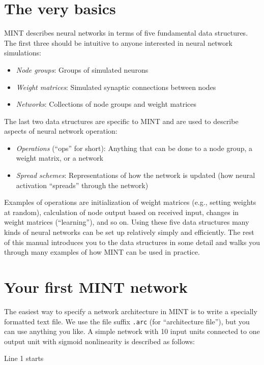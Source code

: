 \documentclass[12pt,letterpaper]{memoir}
\newcommand{\mint}{MINT\xspace}
\begin{document}
\section{The very basics}
\label{sec:the-very-basics}

\mint describes neural networks in terms of five fundamental data
structures. The first three should be intuitive to anyone interested
in neural network simulations:
\begin{itemize}
\item \textit{Node groups}: Groups of simulated neurons
\item \textit{Weight matrices}: Simulated synaptic connections between
  nodes
\item \textit{Networks}: Collections of node groups and weight
  matrices
\end{itemize}
The last two data structures are specific to \mint and are used to
describe aspects of neural network operation:
\begin{itemize}
\item \textit{Operations} (``ops'' for short): Anything that can be
  done to a node group, a weight matrix, or a network
\item\textit{Spread schemes}: Representations of how the network
  is updated (how neural activation ``spreads'' through the network)
\end{itemize}
Examples of operations are initialization of weight matrices (e.g.,
setting weights at random), calculation of node output based on
received input, changes in weight matrices (``learning''), and so
on. Using these five data structures many kinds of neural networks can
be set up relatively simply and efficiently. The rest of this manual
introduces you to the data structures in some detail and walks you
through many examples of how \mint can be used in practice.

\section{Your first \mint network}
\label{sec:first-mint}

The easiest way to specify a network architecture in \mint is to write
a specially formatted text file. We use the file suffix
\lstinline{.arc} (for ``architecture file''), but you can use anything
you like.  A simple network with 10 input units connected to one
output unit with sigmoid nonlinearity is described as follows:

 Line 1 starts
\end{document}
